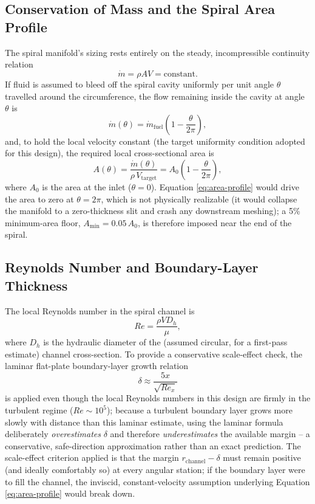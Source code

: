 \documentclass[11pt,a4paper]{article}
\begin{document}
\subsection{Conservation of Mass and the Spiral Area Profile}

The spiral manifold's sizing rests entirely on the steady, incompressible continuity relation
\begin{equation}
\dot{m} = \rho A V = \text{constant}.
\end{equation}
If fluid is assumed to bleed off the spiral cavity uniformly per unit angle $\theta$ travelled around the circumference, the flow remaining inside the cavity at angle $\theta$ is
\begin{equation}
\dot{m}(\theta) = \dot{m}_{\text{fuel}}\left(1 - \frac{\theta}{2\pi}\right),
\end{equation}
and, to hold the local velocity constant (the target uniformity condition adopted for this design), the required local cross-sectional area is
\begin{equation}
A(\theta) = \frac{\dot{m}(\theta)}{\rho\, V_{\text{target}}} = A_0\left(1 - \frac{\theta}{2\pi}\right),
\label{eq:area-profile}
\end{equation}
where $A_0$ is the area at the inlet ($\theta = 0$). Equation \ref{eq:area-profile} would drive the area to zero at $\theta = 2\pi$, which is not physically realizable (it would collapse the manifold to a zero-thickness slit and crash any downstream meshing); a 5\% minimum-area floor, $A_{\min} = 0.05\,A_0$, is therefore imposed near the end of the spiral.

\subsection{Reynolds Number and Boundary-Layer Thickness}

The local Reynolds number in the spiral channel is
\begin{equation}
Re = \frac{\rho V D_h}{\mu},
\end{equation}
where $D_h$ is the hydraulic diameter of the (assumed circular, for a first-pass estimate) channel cross-section. To provide a conservative scale-effect check, the laminar flat-plate boundary-layer growth relation
\begin{equation}
\delta \approx \frac{5x}{\sqrt{Re_x}}
\end{equation}
is applied even though the local Reynolds numbers in this design are firmly in the turbulent regime ($Re \sim 10^5$); because a turbulent boundary layer grows more slowly with distance than this laminar estimate, using the laminar formula deliberately \emph{overestimates} $\delta$ and therefore \emph{underestimates} the available margin -- a conservative, safe-direction approximation rather than an exact prediction. The scale-effect criterion applied is that the margin $r_{\text{channel}} - \delta$ must remain positive (and ideally comfortably so) at every angular station; if the boundary layer were to fill the channel, the inviscid, constant-velocity assumption underlying Equation \ref{eq:area-profile} would break down.
\end{document}
